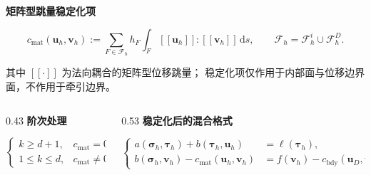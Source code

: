\documentclass[notheorems]{beamer}
\begin{document}
\begin{frame}
{\begin{tcolorbox}
{					\centering
					{\bfseries 矩阵型跳量稳定化项}
					
					\vspace{-2.0em}
					
					\[
					c_{\mathrm{mat}}(\boldsymbol{u}_h,\boldsymbol{v}_h)
					:=
					\sum_{F\in\mathcal{F}_h}
					h_F\int_F
					[\![\boldsymbol{u}_h]\!]:
					[\![\boldsymbol{v}_h]\!]\,\mathrm{d}s,
					\qquad
					\mathcal{F}_h=\mathcal{F}_h^{i}\cup\mathcal{F}_h^{D}.
					\]
					
					\vspace{-1.0em}
					
					{\fontsize{7.0}{9.2}\selectfont
						其中 $[\![\cdot]\!]$ 为法向耦合的矩阵型位移跳量；
						稳定化项仅作用于内部面与位移边界面，不作用于牵引边界。}
					
					\vspace{0.15em}
					
					\begin{columns}[T, totalwidth=\linewidth]
						
						\begin{column}{0.43\linewidth}
							\centering
							{\bfseries 阶次处理}
							
							\vspace{-2.5em}
							
							\[
							\begin{cases}
								k\ge d+1, & c_{\mathrm{mat}}=0,\\[1pt]
								1\le k\le d, & c_{\mathrm{mat}}\ne 0.
							\end{cases}
							\]

						\end{column}
						
						\begin{column}{0.53\linewidth}
							\centering
							{\bfseries 稳定化后的混合格式}
							
							\vspace{-2.5em}
							
							\[
							\left\{
							\begin{aligned}
								a(\boldsymbol{\sigma}_h,\boldsymbol{\tau}_h)
								+
								b(\boldsymbol{\tau}_h,\boldsymbol{u}_h)
								&=
								\ell(\boldsymbol{\tau}_h),
								\\
								b(\boldsymbol{\sigma}_h,\boldsymbol{v}_h)
								-
								c_{\mathrm{mat}}(\boldsymbol{u}_h,\boldsymbol{v}_h)
								&=
								f(\boldsymbol{v}_h)
								-
								c_{\mathrm{bdy}}(\boldsymbol{u}_D,\boldsymbol{v}_h).
							\end{aligned}
							\right.
							\]
						\end{column}
						

\end{columns}}
\end{tcolorbox}}
\end{frame}
\end{document}
